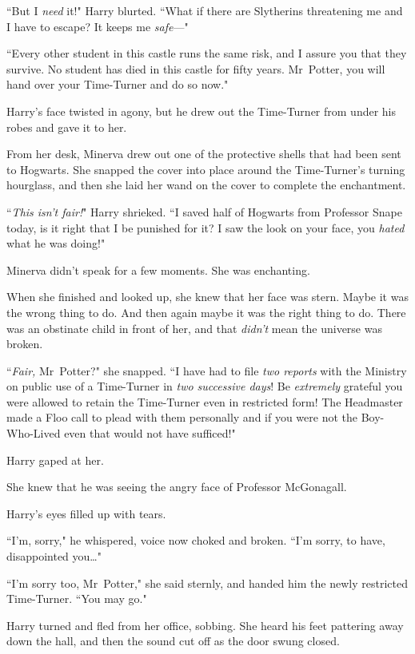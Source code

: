 ``But I \emph{need} it!" Harry blurted. ``What if there are Slytherins threatening me and I have to escape? It keeps me \emph{safe}—"

``Every other student in this castle runs the same risk, and I assure you that they survive. No student has died in this castle for fifty years. Mr~Potter, you will hand over your Time-Turner and do so now."

Harry's face twisted in agony, but he drew out the Time-Turner from under his robes and gave it to her.

From her desk, Minerva drew out one of the protective shells that had been sent to Hogwarts. She snapped the cover into place around the Time-Turner's turning hourglass, and then she laid her wand on the cover to complete the enchantment.

``\emph{This isn't fair!}" Harry shrieked. ``I saved half of Hogwarts from Professor Snape today, is it right that I be punished for it? I saw the look on your face, you \emph{hated} what he was doing!"

Minerva didn't speak for a few moments. She was enchanting.

When she finished and looked up, she knew that her face was stern. Maybe it was the wrong thing to do. And then again maybe it was the right thing to do. There was an obstinate child in front of her, and that \emph{didn't} mean the universe was broken.

``\emph{Fair,} Mr~Potter?" she snapped. ``I have had to file \emph{two reports} with the Ministry on public use of a Time-Turner in \emph{two successive days}! Be \emph{extremely} grateful you were allowed to retain the Time-Turner even in restricted form! The Headmaster made a Floo call to plead with them personally and if you were not the Boy-Who-Lived even that would not have sufficed!"

Harry gaped at her.

She knew that he was seeing the angry face of Professor McGonagall.

Harry's eyes filled up with tears.

``I'm, sorry," he whispered, voice now choked and broken. ``I'm sorry, to have, disappointed you…"

``I'm sorry too, Mr~Potter," she said sternly, and handed him the newly restricted Time-Turner. ``You may go."

Harry turned and fled from her office, sobbing. She heard his feet pattering away down the hall, and then the sound cut off as the door swung closed.

